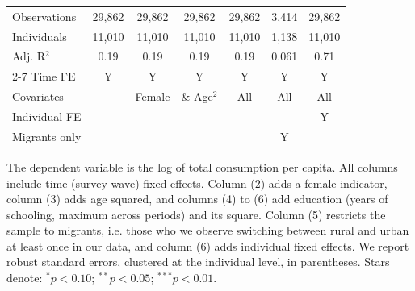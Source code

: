 \begin{table}[htbp]
\begin{threeparttable}
\begin{tabular}{l cccccc}
\addlinespace
Observations        &      29,862   &      29,862   &      29,862   &      29,862   &       3,414   &      29,862   \\
Individuals         &      11,010   &      11,010   &      11,010   &      11,010   &       1,138   &      11,010   \\
Adj. R$^{2}$        &        0.19   &        0.19   &        0.19   &        0.19   &       0.061   &        0.71   \\
\cmidrule{2-7} Time FE & Y & Y & Y & Y & Y & Y \\ Covariates & & Female & \& Age$^2$ & All & All & All \\ Individual FE & & & & & & Y \\ Migrants only & & & & & Y & \\ \bottomrule \end{tabular} \begin{tablenotes}[flushleft] \footnotesize \item{The dependent variable is the log of total consumption per capita. All columns include time (survey wave) fixed effects. Column (2) adds a female indicator, column (3) adds age squared, and columns (4) to (6) add education (years of schooling, maximum across periods) and its square. Column (5) restricts the sample to migrants, i.e. those who we observe switching between rural and urban at least once in our data, and column (6) adds individual fixed effects. We report robust standard errors, clustered at the individual level, in parentheses. Stars denote: $^{*} p<0.10$; $^{**} p<0.05$; $^{***} p<0.01$.} \end{tablenotes} \end{threeparttable} \end{table}
